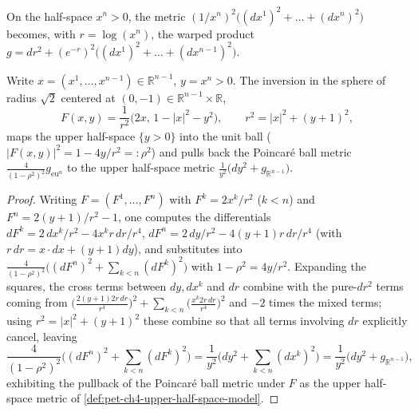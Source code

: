 \begin{definition}
  \label{def:pet-ch4-upper-half-space-model}
  \leanok
  On the half-space $x^n>0$, the metric $(1/x^n)^2\big((dx^1)^2+\dots+(dx^n)^2\big)$
  becomes, with $r=\log(x^n)$, the warped product
  $g=dr^2+(e^{-r})^2\big((dx^1)^2+\dots+(dx^{n-1})^2\big)$.
\end{definition}

\begin{theorem}
  \label{thm:pet-ch4-inversion-isometry}
  Write $x=(x^1,\dots,x^{n-1})\in\mathbb{R}^{n-1}$, $y=x^n>0$. The inversion in the
  sphere of radius $\sqrt2$ centered at $(0,-1)\in\mathbb{R}^{n-1}\times\mathbb{R}$,
  \[
    F(x,y)=\frac1{r^2}\big(2x,\,1-|x|^2-y^2\big),\qquad r^2=|x|^2+(y+1)^2,
  \]
  maps the upper half-space $\{y>0\}$ into the unit ball ($|F(x,y)|^2=1-4y/r^2=:\rho^2$)
  and pulls back the Poincaré ball metric $\tfrac4{(1-\rho^2)^2}g_{\mathrm{eu}^n}$
  to the upper half-space metric $\tfrac1{y^2}\big(dy^2+g_{\mathbb{R}^{n-1}}\big)$.
\end{theorem}
\begin{proof}
  Writing $F=(F^1,\dots,F^n)$ with $F^k=2x^k/r^2$ ($k<n$) and
  $F^n=2(y+1)/r^2-1$, one computes the differentials
  $dF^k=2\,dx^k/r^2-4x^kr\,dr/r^4$, $dF^n=2\,dy/r^2-4(y+1)r\,dr/r^4$ (with
  $r\,dr=x\cdot dx+(y+1)dy$), and substitutes into
  $\tfrac4{(1-\rho^2)^2}\big((dF^n)^2+\sum_{k<n}(dF^k)^2\big)$ with
  $1-\rho^2=4y/r^2$. Expanding the squares, the cross terms between $dy,dx^k$
  and $dr$ combine with the pure-$dr^2$ terms coming from
  $\big(\tfrac{2(y+1)2r\,dr}{r^4}\big)^2+\sum_{k<n}\big(\tfrac{x^k2r\,dr}{r^4}\big)^2$
  and $-2$ times the mixed terms; using $r^2=|x|^2+(y+1)^2$ these combine so
  that all terms involving $dr$ explicitly cancel, leaving
  \[
    \frac4{(1-\rho^2)^2}\big((dF^n)^2+\textstyle\sum_{k<n}(dF^k)^2\big)
    =\frac1{y^2}\Big(dy^2+\sum_{k<n}(dx^k)^2\Big)=\frac1{y^2}\big(dy^2+g_{\mathbb{R}^{n-1}}\big),
  \]
  exhibiting the pullback of the Poincaré ball metric under $F$ as the upper
  half-space metric of \cref{def:pet-ch4-upper-half-space-model}.
\end{proof}

